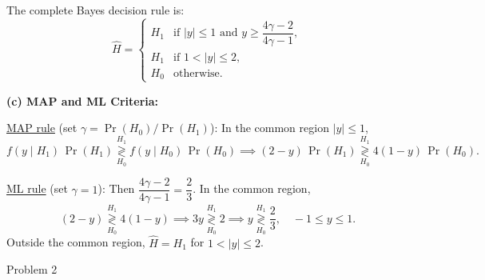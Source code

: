 \documentclass[12pt,a4paper,onecolumn]{exam}
\newcommand{\questionheader}[1]{%
  \begin{tcolorbox}[
    enhanced,
    colback=black,
    coltext=white,
    boxrule=0pt,
    fontupper=\Large\bfseries,
    arc=4mm
  ]
  #1
  \end{tcolorbox}%
}
\begin{document}
\begin{solution}
The complete Bayes decision rule is:
\[
\hat{H} = \begin{cases}
H_1 & \text{if } |y| \leq 1 \text{ and } y \geq \dfrac{4\gamma-2}{4\gamma-1}, \\[6pt]
H_1 & \text{if } 1 < |y| \leq 2, \\[4pt]
H_0 & \text{otherwise.}
\end{cases}
\]

\textbf{(c) MAP and ML Criteria:}

\underline{MAP rule} (set $\gamma = \Pr(H_0)/\Pr(H_1)$): In the common region $|y|\leq 1$,
\[
f(y\mid H_1)\,\Pr(H_1) \underset{H_0}{\overset{H_1}{\gtrless}} f(y\mid H_0)\,\Pr(H_0)
\implies
(2-y)\,\Pr(H_1) \underset{H_0}{\overset{H_1}{\gtrless}} 4(1-y)\,\Pr(H_0).
\]

\underline{ML rule} (set $\gamma = 1$): Then $\dfrac{4\gamma-2}{4\gamma-1} = \dfrac{2}{3}$. In the common region,
\[
(2-y) \underset{H_0}{\overset{H_1}{\gtrless}} 4(1-y)
\implies 3y \underset{H_0}{\overset{H_1}{\gtrless}} 2
\implies y \underset{H_0}{\overset{H_1}{\gtrless}} \frac{2}{3}, \quad -1 \leq y \leq 1.
\]
Outside the common region, $\hat{H}=H_1$ for $1 < |y| \leq 2$.

\end{solution}

\questionheader{Problem 2}
\end{document}
